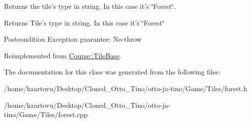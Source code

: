Returns the tile's type in string. In this case it's \char`\"{}\-Forest\char`\"{}. 

\begin{DoxyReturn}{Returns}
Tile's type in string. In this case it's \char`\"{}\-Forest\char`\"{} 
\end{DoxyReturn}
\begin{DoxyPostcond}{Postcondition}
Exception guarantee\-: No-\/throw 
\end{DoxyPostcond}


Reimplemented from \hyperlink{class_course_1_1_tile_base_af1a8aaa3407ad3ade7ffe8f2fb421288}{Course\-::\-Tile\-Base}.



The documentation for this class was generated from the following files\-:\begin{DoxyCompactItemize}
\item 
/home/kaartovu/\-Desktop/\-Cloned\-\_\-\-Otto\-\_\-\-Tino/otto-\/ja-\/tino/\-Game/\-Tiles/forest.\-h\item 
/home/kaartovu/\-Desktop/\-Cloned\-\_\-\-Otto\-\_\-\-Tino/otto-\/ja-\/tino/\-Game/\-Tiles/forest.\-cpp\end{DoxyCompactItemize}
